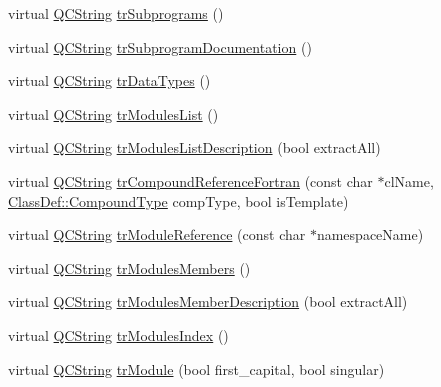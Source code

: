 \begin{DoxyCompactItemize}
\item 
virtual \mbox{\hyperlink{class_q_c_string}{Q\+C\+String}} \mbox{\hyperlink{class_translator_polish_a609501559ed02c21bc28c58db50157b7}{tr\+Subprograms}} ()
\item 
virtual \mbox{\hyperlink{class_q_c_string}{Q\+C\+String}} \mbox{\hyperlink{class_translator_polish_a7759af3d313fcb8cf172524cbcf893b4}{tr\+Subprogram\+Documentation}} ()
\item 
virtual \mbox{\hyperlink{class_q_c_string}{Q\+C\+String}} \mbox{\hyperlink{class_translator_polish_acb28b0dd728c14571732cad0353ad699}{tr\+Data\+Types}} ()
\item 
virtual \mbox{\hyperlink{class_q_c_string}{Q\+C\+String}} \mbox{\hyperlink{class_translator_polish_a47ca5b246c223fbc328a4cfef594b33b}{tr\+Modules\+List}} ()
\item 
virtual \mbox{\hyperlink{class_q_c_string}{Q\+C\+String}} \mbox{\hyperlink{class_translator_polish_abe9b65112ac36ccb30f5cbc9319080c3}{tr\+Modules\+List\+Description}} (bool extract\+All)
\item 
virtual \mbox{\hyperlink{class_q_c_string}{Q\+C\+String}} \mbox{\hyperlink{class_translator_polish_a7113434d4c40967713882a271c0fb478}{tr\+Compound\+Reference\+Fortran}} (const char $\ast$cl\+Name, \mbox{\hyperlink{class_class_def_ae70cf86d35fe954a94c566fbcfc87939}{Class\+Def\+::\+Compound\+Type}} comp\+Type, bool is\+Template)
\item 
virtual \mbox{\hyperlink{class_q_c_string}{Q\+C\+String}} \mbox{\hyperlink{class_translator_polish_a42dcfc97bef0cd7d9b17fdbc34a6bf0d}{tr\+Module\+Reference}} (const char $\ast$namespace\+Name)
\item 
virtual \mbox{\hyperlink{class_q_c_string}{Q\+C\+String}} \mbox{\hyperlink{class_translator_polish_ae2ad3d07059f895fd9aa7f69c76ce72a}{tr\+Modules\+Members}} ()
\item 
virtual \mbox{\hyperlink{class_q_c_string}{Q\+C\+String}} \mbox{\hyperlink{class_translator_polish_af73d04434111580225dd1c66b9ea158b}{tr\+Modules\+Member\+Description}} (bool extract\+All)
\item 
virtual \mbox{\hyperlink{class_q_c_string}{Q\+C\+String}} \mbox{\hyperlink{class_translator_polish_ae16f884f1db65a68a7d20b0d9be0ab77}{tr\+Modules\+Index}} ()
\item 
virtual \mbox{\hyperlink{class_q_c_string}{Q\+C\+String}} \mbox{\hyperlink{class_translator_polish_af3a66c1f9b4c098eea416acc70878266}{tr\+Module}} (bool first\+\_\+capital, bool singular)
\item 

\end{DoxyCompactItemize}

